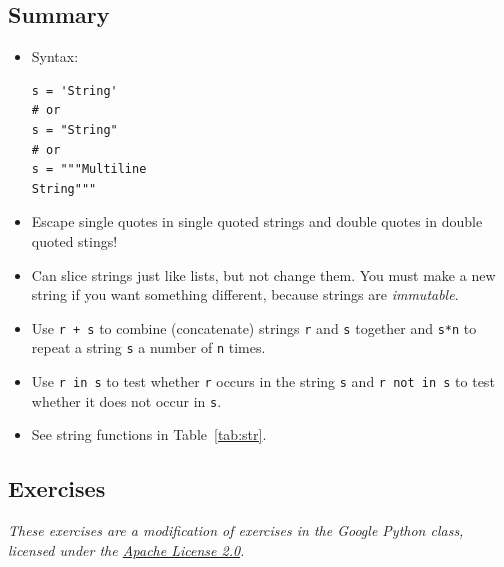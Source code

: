 \documentclass[11pt]{cselabheader}
\begin{document}
\subsection{Summary}

\begin{itemize}
  \item Syntax:
    \begin{lstlisting}
s = 'String'
# or
s = "String"
# or
s = """Multiline
String"""
    \end{lstlisting}

  \item Escape single quotes in single quoted strings and double quotes in
    double quoted stings!

  \item Can slice strings just like lists, but not change them. You must make a
    new string if you want something different, because strings are
    \emph{immutable}.

  \item Use \lstinline!r + s! to combine (concatenate) strings \lstinline!r! and
    \lstinline!s! together and
    \lstinline!s*n! to repeat a string \lstinline!s! a number of \lstinline!n!
    times.

  \item Use \lstinline!r in s! to test whether \lstinline!r! occurs in the
    string \lstinline!s! and \lstinline!r not in s! to test whether it does not
    occur in \lstinline!s!.

  \item See string functions in Table~\ref{tab:str}.
\end{itemize}

\subsection{Exercises}
\label{subsec:stringsex}

\emph{These exercises are a modification of exercises in the Google Python
  class, licensed under the
  \href{http://www.apache.org/licenses/LICENSE-2.0.html}{Apache License 2.0}.}
\end{document}

